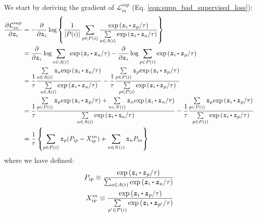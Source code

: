 We start by deriving the gradient of $\mathcal{L}_{in}^{sup}$ (Eq. \ref{eqn:supp_bad_supervised_loss}):
\begin{align}
  \frac{\partial\mathcal{L}_{in}^{sup}}{\partial\boldsymbol{z}_i} & = -\frac{\partial}{\partial\boldsymbol{z}_i}\log\left\{\frac{1}{|P(i)|}\sum_{p\in P(i)}\frac{\text{exp}\left(\boldsymbol{z}_i\bigcdot\boldsymbol{z}_p/\tau\right)}{\sum\limits_{a\in A(i)}\text{exp}\left(\boldsymbol{z}_i\bigcdot\boldsymbol{z}_a/\tau\right)}\right\}\nonumber\\
  & = \frac{\partial}{\partial\boldsymbol{z}_i}\log\sum\limits_{a\in A(i)}\text{exp}\left(\boldsymbol{z}_i\bigcdot\boldsymbol{z}_a/\tau\right)-\frac{\partial}{\partial\boldsymbol{z}_i}\log\sum\limits_{p\in P(i)}\text{exp}\left(\boldsymbol{z}_i\bigcdot\boldsymbol{z}_p/\tau\right)\nonumber\\
  & = \frac{1}{\tau}\frac{\sum\limits_{a\in A(i)}\boldsymbol{z}_a\text{exp}\left(\boldsymbol{z}_i\bigcdot\boldsymbol{z}_a/\tau\right)}{\sum\limits_{a\in A(i)}\text{exp}\left(\boldsymbol{z}_i\bigcdot\boldsymbol{z}_a/\tau\right)}-\frac{1}{\tau}\frac{\sum\limits_{p\in P(i)}\boldsymbol{z}_p\text{exp}\left(\boldsymbol{z}_i\bigcdot\boldsymbol{z}_p/\tau\right)}{\sum\limits_{p\in P(i)}\text{exp}\left(\boldsymbol{z}_i\bigcdot\boldsymbol{z}_p/\tau\right)}\nonumber\\
  & = \frac{1}{\tau}\frac{\sum\limits_{p\in P(i)}\boldsymbol{z}_p\text{exp}\left(\boldsymbol{z}_i\bigcdot\boldsymbol{z}_p/\tau\right)+\sum\limits_{n\in N(i)}\boldsymbol{z}_n\text{exp}\left(\boldsymbol{z}_i\bigcdot\boldsymbol{z}_n/\tau\right)}{\sum\limits_{a\in A(i)}\text{exp}\left(\boldsymbol{z}_i\bigcdot\boldsymbol{z}_a/\tau\right)}-\frac{1}{\tau}\frac{\sum\limits_{p\in P(i)}\boldsymbol{z}_p\text{exp}\left(\boldsymbol{z}_i\bigcdot\boldsymbol{z}_p/\tau\right)}{\sum\limits_{p\in P(i)}\text{exp}\left(\boldsymbol{z}_i\bigcdot\boldsymbol{z}_p/\tau\right)}\nonumber\\
  & = \frac{1}{\tau}\left\{\sum_{p\in P(i)}\boldsymbol{z}_p(P_{ip}-X_{ip}^{in})+\sum_{n\in N(i)}\boldsymbol{z}_nP_{in}\right\}
  \label{eqn:supp_bad_supervised_loss_gradient}
\end{align}
where we have defined:
\begin{align}
  P_{ip}\equiv\frac{\text{exp}\left(\boldsymbol{z}_i\bigcdot\boldsymbol{z}_p/\tau\right)}{\sum_{a\in A(i)}\text{exp}\left(\boldsymbol{z}_i\bigcdot\boldsymbol{z}_a/\tau\right)}
  \label{eqn:supp_pip} \\
  X_{ip}^{in}\equiv\frac{\text{exp}\left(\boldsymbol{z}_i\bigcdot\boldsymbol{z}_p/\tau\right)}{\sum\limits_{p'\in P(i)}\text{exp}\left(\boldsymbol{z}_i\bigcdot\boldsymbol{z}_{p'}/\tau\right)}
\end{align}
